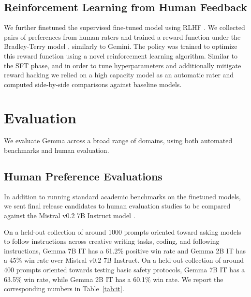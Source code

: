 \documentclass[11pt, a4paper, logo, twocolumn, copyright, nonumbering]{googledeepmind}
\begin{document}
\subsection{Reinforcement Learning from Human Feedback}

We further finetuned the supervised fine-tuned model using RLHF \citep{christiano2017deep,ouyang2022training}. We collected pairs of preferences from human raters and trained a reward function under the Bradley-Terry model \citep{bradley1952rank}, similarly to Gemini. The policy was trained to optimize this reward function using a novel reinforcement learning algorithm. Similar to the SFT phase, and in order to tune hyperparameters and additionally mitigate reward hacking \citep{amodei2016concrete,skalse2022defining} we relied on a high capacity model as an automatic rater and computed side-by-side comparisons against baseline models.

\section{Evaluation}
\label{sec:evals}

We evaluate Gemma across a broad range of domains, using both automated benchmarks and human evaluation.

\subsection{Human Preference Evaluations}
\label{sec:humanevals}

In addition to running standard academic benchmarks on the finetuned models, we sent final release candidates to human evaluation studies to be compared against the Mistral v0.2 7B Instruct model \citep{mistral}.

On a held-out collection of around 1000 prompts oriented toward asking models to follow instructions across creative writing tasks, coding, and following instructions, Gemma 7B IT has a 61.2\% positive win rate and Gemma 2B IT has a 45\% win rate over Mistral v0.2 7B Instruct. On a held-out collection of around 400 prompts oriented towards testing basic safety protocols, Gemma 7B IT has a 63.5\% win rate, while Gemma 2B IT has a 60.1\% win rate. We report the corresponding numbers in Table~\ref{tab:it}.
\end{document}
